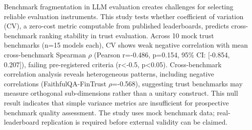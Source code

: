 
Benchmark fragmentation in LLM evaluation creates challenges for selecting reliable evaluation instruments. This study tests whether coefficient of variation (CV), a zero-cost metric computable from published leaderboards, predicts cross-benchmark ranking stability in trust evaluation. Across 10 mock trust benchmarks (n=15 models each), CV shows weak negative correlation with mean cross-benchmark Spearman $\rho$ (Pearson r=-0.486, p=0.154, 95\% CI: [-0.854, 0.207]), failing pre-registered criteria (r<-0.5, p<0.05). Cross-benchmark correlation analysis reveals heterogeneous patterns, including negative correlations (FaithfulQA-FinTrust $\rho$=-0.568), suggesting trust benchmarks may measure orthogonal sub-dimensions rather than a unitary construct. This null result indicates that simple variance metrics are insufficient for prospective benchmark quality assessment. The study uses mock benchmark data; real-leaderboard replication is required before external validity can be claimed.
